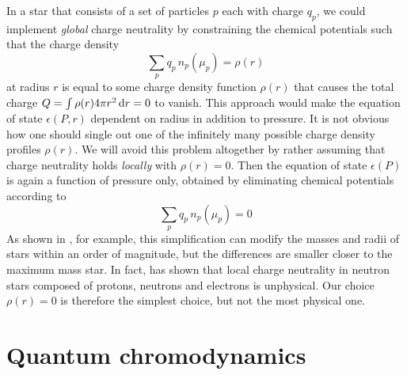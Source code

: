 In a star that consists of a set of particles $p$ each with charge $q_p$, we could implement \emph{global} charge neutrality by constraining the chemical potentials such that the charge density
\begin{equation}
	\sum_p q_p \, n_p(\mu_p) = \rho(r)
\label{eq:intro:charge_neutrality_global}
\end{equation}
at radius $r$ is equal to some charge density function $\rho(r)$ that causes the total charge $Q = \int \rho(r) 4 \pi r^2 \mathop{}\!\mathrm{d} r = 0$  to vanish.
This approach would make the equation of state $\epsilon(P,r)$ dependent on radius in addition to pressure.
It is not obvious how one should single out one of the infinitely many possible charge density profiles $\rho(r)$.
We will avoid this problem altogether by rather assuming that charge neutrality holds \emph{locally} with $\rho(r) = 0$.
Then the equation of state $\epsilon(P)$ is again a function of pressure only, obtained by eliminating chemical potentials according to
\begin{equation}
	\sum_p q_p \, n_p(\mu_p) = 0
\label{eq:lsm:charge_neutrality}
\end{equation}
As shown in \cite{ref:global_neutrality}, for example, this simplification can modify the masses and radii of stars within an order of magnitude, but the differences are smaller closer to the maximum mass star.
In fact, \cite{ref:local_neutrality_inconsistent} has shown that local charge neutrality in neutron stars composed of protons, neutrons and electrons is unphysical.
Our choice $\rho(r)=0$ is therefore the simplest choice, but not the most physical one.

\section{Quantum chromodynamics}

